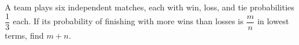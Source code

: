 A team plays six independent matches, each with win, loss, and tie probabilities $\dfrac{1}{3}$ each. If its probability of finishing with more wins than losses is $\dfrac{m}{n}$ in lowest terms, find $m+n$.
